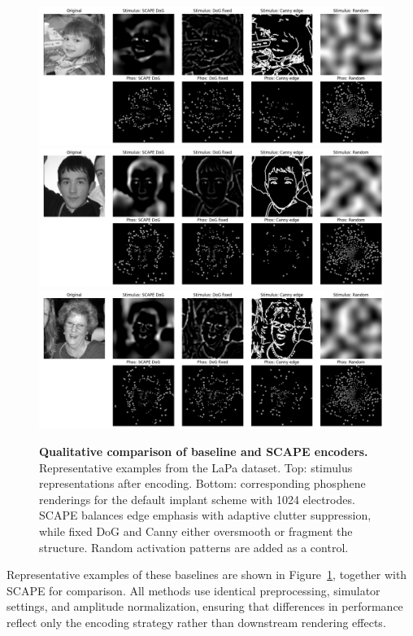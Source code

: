 \begin{figure}[ht!]
    \centering
    \includegraphics[width=\textwidth]{figures/processingmethods1.png}
    \includegraphics[width=\textwidth]{figures/processingmethods2.png}
    \includegraphics[width=\textwidth]{figures/processingmethods3.png}
    \caption{\textbf{Qualitative comparison of baseline and SCAPE encoders.} 
    Representative examples from the LaPa dataset. Top: stimulus representations after encoding. Bottom: corresponding phosphene renderings for the default implant scheme with 1024 electrodes. 
    SCAPE balances edge emphasis with adaptive clutter suppression, while fixed DoG and Canny either oversmooth or fragment the structure. Random activation patterns are added as a control.}
    \label{fig:qualitative}
\end{figure}

\medskip
Representative examples of these baselines are shown in Figure~\ref{fig:qualitative}, together with SCAPE for comparison. All methods use identical preprocessing, simulator settings, and amplitude normalization, ensuring that differences in performance reflect only the encoding strategy rather than downstream rendering effects.

